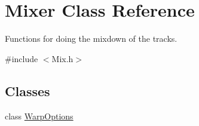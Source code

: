 \hypertarget{class_mixer}{}\section{Mixer Class Reference}
\label{class_mixer}


Functions for doing the mixdown of the tracks.  




{\ttfamily \#include $<$Mix.\+h$>$}

\subsection*{Classes}
\begin{DoxyCompactItemize}
\item 
class \hyperlink{class_mixer_1_1_warp_options}{Warp\+Options}
\end{DoxyCompactItemize}
